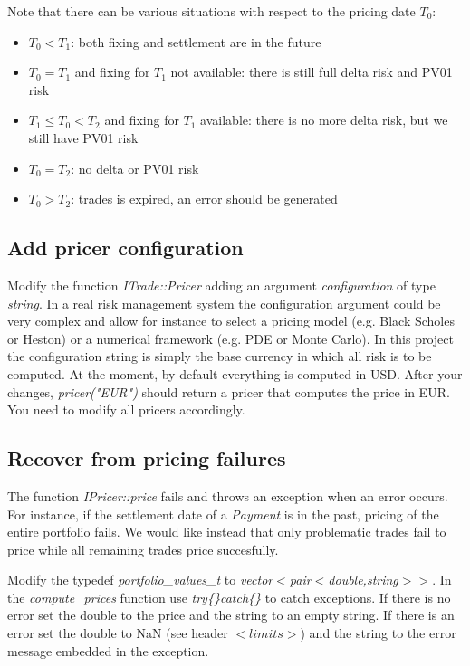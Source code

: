 \documentclass[10pt]{article}
\begin{document}
Note that there can be various situations with respect to the pricing date $T_0$:
\begin{itemize}
	\item $T_0< T_1$: both fixing and settlement are in the future
	\item $T_0 = T_1$ and fixing for $T_1$ not available: there is still full delta risk and PV01 risk
	\item $ T_1 \leq T_0 < T_2$ and fixing for $T_1$ available: there is no more delta risk, but we still have PV01 risk
	\item $T_0 = T_2$: no delta or PV01 risk
	\item $T_0 > T_2$: trades is expired, an error should be generated
\end{itemize}

\subsection{Add pricer configuration}
Modify the function \textit{ITrade::Pricer} adding an argument \textit{configuration} of type \textit{string}. In a real risk management system the configuration argument could be very complex and allow for instance to select a pricing model (e.g. Black Scholes or Heston) or a numerical framework (e.g. PDE or Monte Carlo). In this project the configuration string is simply the base currency in which all risk is to be computed. At the moment, by default everything is computed in USD. After your changes, \textit{pricer("EUR")} should return a pricer that computes the price in EUR.\\

You need to modify all pricers accordingly.

\subsection{Recover from pricing failures}
The function \textit{IPricer::price} fails and throws an exception when an error occurs. For instance, if the settlement date of a \textit{Payment} is in the past, pricing of the entire portfolio fails. We would like instead that only problematic trades fail to price while all remaining trades price succesfully.

Modify the typedef \textit{portfolio\_values\_t} to \textit{vector$<$pair$<$double,string$>>$}. In the \textit{compute\_prices} function use \textit{try\{\}catch\{\}} to catch exceptions. If there is no error set the double to the price and the string to an empty string. If there is an error set the double to NaN (see header $<limits>$) and the string to the error message embedded in the exception.
\end{document}
